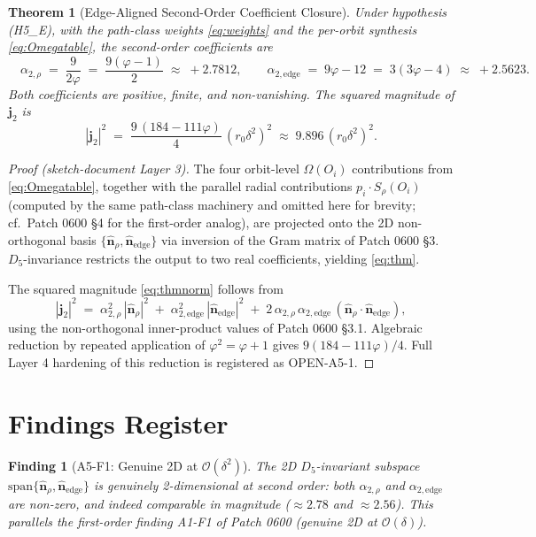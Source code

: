 \documentclass[11pt]{article}
\newtheorem{theorem}{Theorem}
\newtheorem{finding}{Finding}
\begin{document}
\begin{theorem}[Edge-Aligned Second-Order Coefficient Closure]\label{thm:main}
Under hypothesis (H5\_E), with the path-class weights \eqref{eq:weights}
and the per-orbit synthesis \eqref{eq:Omegatable}, the second-order
coefficients are
\begin{equation}
\boxed{
\quad
\alpha_{2,\rho} \;=\; \frac{9}{2\varphi}
\;=\; \frac{9(\varphi-1)}{2}
\;\approx\; +2.7812,
\qquad
\alpha_{2,\text{edge}} \;=\; 9\varphi - 12
\;=\; 3(3\varphi - 4)
\;\approx\; +2.5623.
\quad
}
\label{eq:thm}
\end{equation}
Both coefficients are positive, finite, and non-vanishing. The squared
magnitude of $\mathbf{j}_2$ is
\begin{equation}
|\mathbf{j}_2|^2 \;=\; \frac{9\,(184 - 111\varphi)}{4}\,(r_0\delta^2)^2
\;\approx\; 9.896\,(r_0\delta^2)^2.
\label{eq:thmnorm}
\end{equation}
\end{theorem}

\begin{proof}[Proof (sketch-document Layer 3)]
The four orbit-level $\Omega(O_i)$ contributions from
\eqref{eq:Omegatable}, together with the parallel radial contributions
$p_i \cdot S_\rho(O_i)$ (computed by the same path-class machinery and
omitted here for brevity; cf.\ Patch 0600 §4 for the first-order analog),
are projected onto the 2D non-orthogonal basis
$\{\hat{\mathbf{n}}_\rho,\hat{\mathbf{n}}_{\text{edge}}\}$ via inversion
of the Gram matrix of Patch 0600 §3. $D_5$-invariance restricts the
output to two real coefficients, yielding \eqref{eq:thm}.

The squared magnitude \eqref{eq:thmnorm} follows from
\[
|\mathbf{j}_2|^2 \;=\; \alpha_{2,\rho}^2\,|\hat{\mathbf{n}}_\rho|^2
\;+\; \alpha_{2,\text{edge}}^2\,|\hat{\mathbf{n}}_{\text{edge}}|^2
\;+\; 2\,\alpha_{2,\rho}\,\alpha_{2,\text{edge}}\,
(\hat{\mathbf{n}}_\rho \cdot \hat{\mathbf{n}}_{\text{edge}}),
\]
using the non-orthogonal inner-product values of Patch 0600 §3.1.
Algebraic reduction by repeated application of $\varphi^2 = \varphi + 1$
gives $9(184 - 111\varphi)/4$. Full Layer 4 hardening of this reduction
is registered as OPEN-A5-1.
\end{proof}

\section{Findings Register}

\begin{finding}[A5-F1: Genuine 2D at $\mathcal{O}(\delta^2)$]\label{find:A5F1}
The 2D $D_5$-invariant subspace $\mathrm{span}\{\hat{\mathbf{n}}_\rho,
\hat{\mathbf{n}}_{\text{edge}}\}$ is genuinely 2-dimensional at second
order: both $\alpha_{2,\rho}$ and $\alpha_{2,\text{edge}}$ are non-zero,
and indeed comparable in magnitude ($\approx 2.78$ and $\approx 2.56$).
This parallels the first-order finding A1-F1 of Patch 0600 (genuine 2D
at $\mathcal{O}(\delta)$).
\end{finding}
\end{document}
